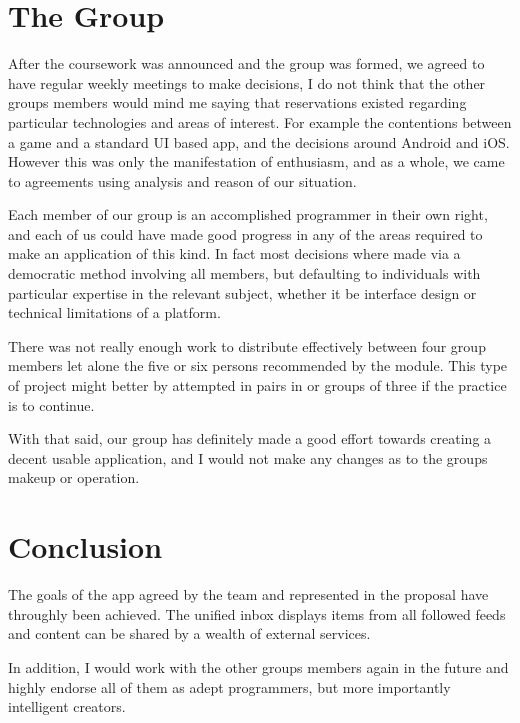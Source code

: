 \documentclass[a4paper,11pt]{article}
\begin{document}
	\section{The Group}
    
	After the coursework was announced and the group was formed, we agreed to have regular weekly meetings to make decisions, I do not think that the other groups members would mind me saying that reservations existed regarding particular technologies and areas of interest. For example the contentions between a game and a standard UI based app, and the decisions around Android and iOS. However this was only the manifestation of enthusiasm, and as a whole, we came to agreements using analysis and reason of our situation.
	
	Each member of our group is an accomplished programmer in their own right, and each of us could have made good progress in any of the areas required to make an application of this kind. In fact most decisions where made via a democratic method involving all members, but defaulting to individuals with particular expertise in the relevant subject, whether it be interface design or technical limitations of a platform.
	
	There was not really enough work to distribute effectively between four group members let alone the five or six persons recommended by the module. This type of project might better by attempted in pairs in or groups of three if the practice is to continue.
	
	With that said, our group has definitely made a good effort towards creating a decent usable application, and I would not make any changes as to the groups makeup or operation.
	
	\section{Conclusion}
	
	The goals of the app agreed by the team and represented in the proposal have throughly been achieved. The unified inbox displays items from all followed feeds and content can be shared by a wealth of external services.
	
	In addition, I would work with the other groups members again in the future and highly endorse all of them as adept programmers, but more importantly intelligent creators.
\end{document}
